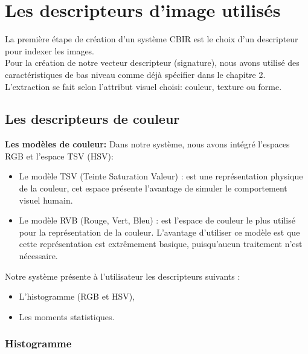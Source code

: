 \section{Les descripteurs d’image utilisés}
La première étape de création d'un système CBIR est le choix d'un descripteur pour indexer les images. \\
Pour la création de notre vecteur descripteur (signature), nous avons utilisé des caractéristiques de bas niveau comme déjà spécifier dans le chapitre 2. L'extraction se fait selon l'attribut visuel choisi: couleur, texture ou forme.
\subsection{Les descripteurs de couleur}
\textbf{Les modèles de couleur: }
Dans notre système, nous avons intégré l'espaces RGB et l'espace TSV (HSV):\\

\begin{itemize}
	\item Le modèle TSV (Teinte Saturation Valeur) : est une représentation physique de la couleur, cet espace présente l’avantage de simuler le comportement visuel humain.
	
	\item Le modèle RVB (Rouge, Vert, Bleu) : est l’espace de couleur le plus utilisé pour la représentation de la couleur. L’avantage d’utiliser ce modèle est que cette représentation est extrêmement basique, puisqu’aucun traitement n’est nécessaire.
\end{itemize}

Notre système présente à l'utilisateur les descripteurs suivants :
\begin{itemize}
	\item L'histogramme (RGB et HSV),
	\item Les moments statistiques.
\end{itemize}

\subsubsection{Histogramme}
